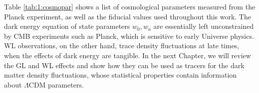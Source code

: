 %
Table \ref{tab:1:cosmopar} shows a list of cosmological parameters measured from the Planck experiment, as well as the fiducial values used throughout this work. The dark energy equation of state parameters $w_0,w_a$ are essentially left unconstrained by CMB experiments such as Planck, which is sensitive to early Universe physics. WL observations, on the other hand, trace density fluctuations at late times, when the effects of dark energy are tangible. In the next Chapter, we will review the GL and WL effects and show how they can be used as tracers for the dark matter density fluctuations, whose statistical properties contain information about $\Lambda$CDM parameters. 

%